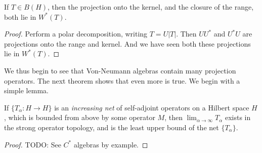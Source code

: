 \begin{corollary}
    If $T \in B(H)$, then the projection onto the kernel, and the closure of the range, both lie in $W^*(T)$.
\end{corollary}
\begin{proof}
    Perform a polar decomposition, writing $T = U|T|$. Then $UU^*$ and $U^*U$ are projections onto the range and kernel. And we have seen both these projections lie in $W^*(T)$.
\end{proof}

We thus begin to see that Von-Neumann algebras contain many projection operators. The next theorem shows that even more is true. We begin with a simple lemma.

\begin{lemma}
    If $\{ T_\alpha: H \to H \}$ is an \emph{increasing net} of self-adjoint operators on a Hilbert space $H$, which is bounded from above by some operator $M$, then $\lim_{\alpha \to \infty} T_\alpha$ exists in the strong operator topology, and is the least upper bound of the net $\{ T_\alpha \}$.
\end{lemma}
\begin{proof}
    TODO: See $C^*$ algebras by example.
\end{proof}

